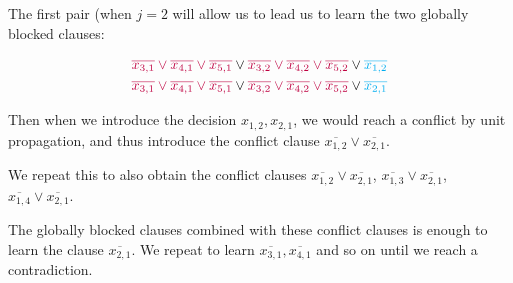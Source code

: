 The first pair (when $j = 2$ will allow us to lead us to learn the two globally blocked clauses:

\begin{gather*}
    \textcolor{purple}{\overline{x_{3, 1}} \lor \overline{x_{4, 1}} \lor \overline{x_{5, 1}}} \lor \textcolor{purple}{\overline{x_{3, 2}} \lor \overline{x_{4, 2}} \lor \overline{x_{5, 2}}} \lor \textcolor{cyan}{\overline{x_{1, 2}}} \\
    \textcolor{purple}{\overline{x_{3, 1}} \lor \overline{x_{4, 1}} \lor \overline{x_{5, 1}}} \lor \textcolor{purple}{\overline{x_{3, 2}} \lor \overline{x_{4, 2}} \lor \overline{x_{5, 2}}} \lor \textcolor{cyan}{\overline{x_{2, 1}}} 
\end{gather*}

Then when we introduce the decision $x_{1, 2}, x_{2, 1}$, we would reach a conflict by unit propagation, and thus introduce the conflict clause $\overline{x_{1, 2}} \lor \overline{x_{2, 1}}$.

We repeat this to also obtain the conflict clauses $\overline{x_{1, 2}} \lor \overline{x_{2, 1}}$, $\overline{x_{1, 3}} \lor \overline{x_{2, 1}}$, $\overline{x_{1, 4}} \lor \overline{x_{2, 1}}$.

The globally blocked clauses combined with these conflict clauses is enough to learn the clause $\overline{x_{2, 1}}$. We repeat to learn $\overline{x_{3, 1}}, \overline{x_{4, 1}}$ and so on until we reach a contradiction. 


    
